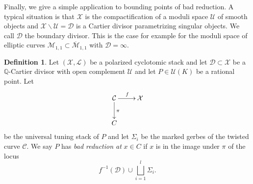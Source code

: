 \documentclass[a4paper,12pt]{amsart}
\theoremstyle{definition}
\newtheorem{defn}[thm]{Definition}
\newcommand{\cX}{\mathcal{X}}
\newcommand{\cU}{\mathcal{U}}
\newcommand{\cC}{\mathcal{C}}
\newcommand{\cD}{\mathcal{D}}
\newcommand{\cL}{\mathcal{L}}
\newcommand{\cM}{\mathcal{M}}
\newcommand{\Q}{\mathbb{Q}}
\renewcommand{\setminus}{\smallsetminus}
\begin{document}
	Finally, we give a simple application to bounding points of bad reduction. A typical situation is that $\cX$ is the compactification of a moduli space $\cU$ of smooth objects and $\cX \setminus \cU = \cD$ is a Cartier divisor parametrizing singular objects. We call $\cD$ the boundary divisor. This is the case for example for the moduli space of elliptic curves $\cM_{1,1} \subset \overline{\cM}_{1,1}$ with $\cD = \infty$. 
	
	\begin{defn}\label{def:badred}
		Let $(\cX, \cL)$ be a polarized cyclotomic stack and let $\cD \subset \cX$ be a $\Q$-Cartier divisor with open complement $\cU$ and let $P \in \cU(K)$ be a rational point. Let 
		\[
		\xymatrix{\cC \ar[d]^{\pi} \ar[r]^f & \cX \\ C & }
		\]
		be the universal tuning stack of $P$ and let $\Sigma_i$ be the marked gerbes of the twisted curve $\cC$. We say $P$ has \emph{bad reduction at} $x \in C$ if $x$ is in the image under $\pi$ of the locus
		$$
		f^{-1}(\cD) \cup \bigsqcup_{i = 1}^l \Sigma_i.
		$$
		
	\end{defn}
	
\end{document}
